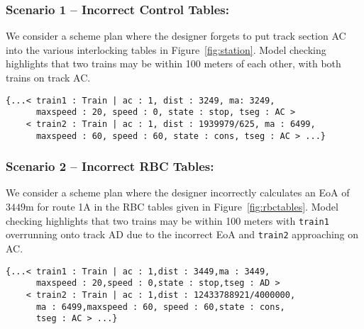 \subsubsection*{Scenario 1 -- Incorrect Control Tables:} We
consider a scheme plan where the designer forgets to put track section
AC into the various interlocking tables in
Figure~\ref{fig:station}. Model checking highlights that two trains
may be within 100 meters of each other, with both trains on track AC.

\begin{lstlisting}
{...< train1 : Train | ac : 1, dist : 3249, ma: 3249,
      maxspeed : 20, speed : 0, state : stop, tseg : AC >
    < train2 : Train | ac : 1, dist : 1939979/625, ma : 6499,
      maxspeed : 60, speed : 60, state : cons, tseg : AC > ...}
\end{lstlisting}

\subsubsection*{Scenario 2 -- Incorrect RBC Tables:} We
consider a scheme plan where the designer incorrectly calculates an EoA
of $3449$m for route 1A in the RBC tables given in
Figure~\ref{fig:rbctables}. Model checking highlights that two trains
may be within 100 meters with \verb|train1| overrunning onto track AD due
to the incorrect EoA and \verb|train2| approaching on AC.

\begin{lstlisting}
{...< train1 : Train | ac : 1,dist : 3449,ma : 3449,
      maxspeed : 20,speed : 0,state : stop,tseg : AD >
    < train2 : Train | ac : 1,dist : 12433788921/4000000,
      ma : 6499,maxspeed : 60, speed : 60,state : cons,
      tseg : AC > ...}
\end{lstlisting}

